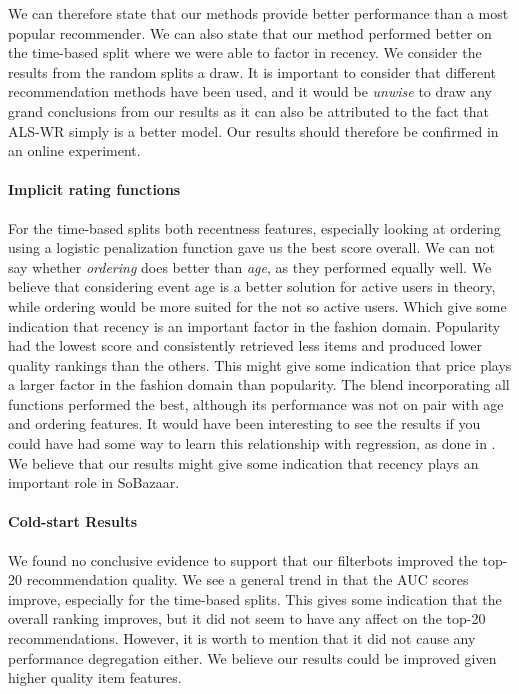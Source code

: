We can therefore state that our methods provide better performance than a most popular recommender.
We can also state that our method performed better on the time-based split where we were able to factor in recency. We consider
the results from the random splits a draw. It is important to consider that different recommendation methods
have been used, and it would be \emph{unwise} to draw any grand conclusions from our results as it can also be attributed to the fact that ALS-WR simply is a better model. Our results should therefore be confirmed in an online experiment.

\paragraph{Implicit rating functions}

For the time-based splits both recentness features, especially looking at ordering using a logistic penalization function
gave us the best score overall. We can not say whether \emph{ordering} does better than \emph{age},
as they performed equally well. We believe that considering event age is a better solution for active users in theory, while ordering
would be more suited for the not so active users. Which give some indication that recency is an important factor
in the fashion domain. Popularity had the lowest score and consistently retrieved less items and produced lower quality
rankings than the others. This might give some indication that price plays a larger factor in the fashion domain
than popularity. The blend incorporating all functions performed the best, although its performance was not on pair
with age and ordering features. It would have been interesting to see the results if you could have had some way to learn
this relationship with regression, as done in \cite{parra2011walk}. We believe that our results might give some indication
that recency plays an important role in SoBazaar.

\paragraph{Cold-start Results}

We found no conclusive evidence to support that our filterbots improved the top-20 recommendation quality. We see a general
trend in that the AUC scores improve, especially for the time-based splits. This gives some indication that
the overall ranking improves, but it did not seem to have any affect on the top-20 recommendations.
However, it is worth to mention that it did not cause any performance degregation either. We believe our results
could be improved given higher quality item features.

